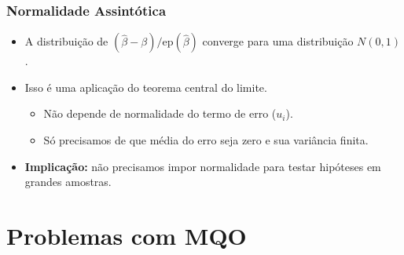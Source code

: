 \documentclass[10pt,slides,xcolor=pdftex,dvipsnames,table]{beamer}
\begin{document}

\begin{frame}[fragile]
	\frametitle{Normalidade Assintótica}

\begin{itemize}\itemsep1.2em 

\item A distribuição de $(\widehat{\beta} - \beta)/ \text{ep} (\widehat{\beta})$ converge para uma distribuição $N(0,1)$.  

\item Isso é uma aplicação do teorema central do limite. 
\begin{itemize}
\item Não depende de normalidade do termo de erro ($u_i$).
\item Só precisamos de que média do erro seja zero e sua variância finita. 
\end{itemize} 

\item \textbf{Implicação:} não precisamos impor normalidade para testar hipóteses em grandes amostras. 

\end{itemize}

\end{frame}


\section{Problemas com MQO}

\end{document}
